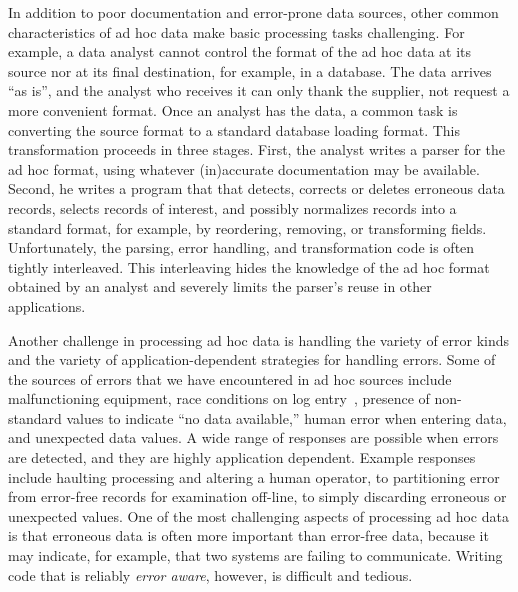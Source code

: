
In addition to poor documentation and error-prone data sources, other
common characteristics of ad hoc data make basic processing tasks
challenging.  For example, a data analyst cannot control the format of
the ad hoc data at its source nor at its final destination, for
example, in a database.  The data arrives ``as is'', and the analyst
who receives it can only thank the supplier, not request a more
convenient format.  Once an analyst has the data, a common task is
converting the source format to a standard database loading format.
This transformation proceeds in three stages.  First, the analyst
writes a parser for the ad hoc format, using whatever (in)accurate
documentation may be available.  Second, he writes a program that that
detects, corrects or deletes erroneous data records, selects records
of interest, and possibly normalizes records into a standard format,
for example, by reordering, removing, or transforming fields.
Unfortunately, the parsing, error handling, and transformation code is
often tightly interleaved.  This interleaving hides the knowledge of
the ad hoc format obtained by an analyst and severely limits the
parser's reuse in other applications.


Another challenge in processing ad hoc data is handling the variety of
error kinds and the variety of application-dependent strategies for
handling errors.  Some of the sources of errors that we have
encountered in ad hoc sources include malfunctioning equipment, race
conditions on log entry~\cite{wpp}, presence of non-standard values to
indicate ``no data available,'' human error when entering data, and
unexpected data values.  A wide range of responses are possible when errors
are detected, and they are highly application dependent.  Example
responses include haulting processing and altering a human operator, to
partitioning error from error-free records for examination off-line, to
simply discarding erroneous or unexpected values.  One of the most
challenging aspects of processing ad hoc data is that erroneous data
is often more important than error-free data, because it may indicate,
for example, that two systems are failing to communicate.  Writing
code that is reliably \emph{error aware}, however, is difficult and
tedious.

